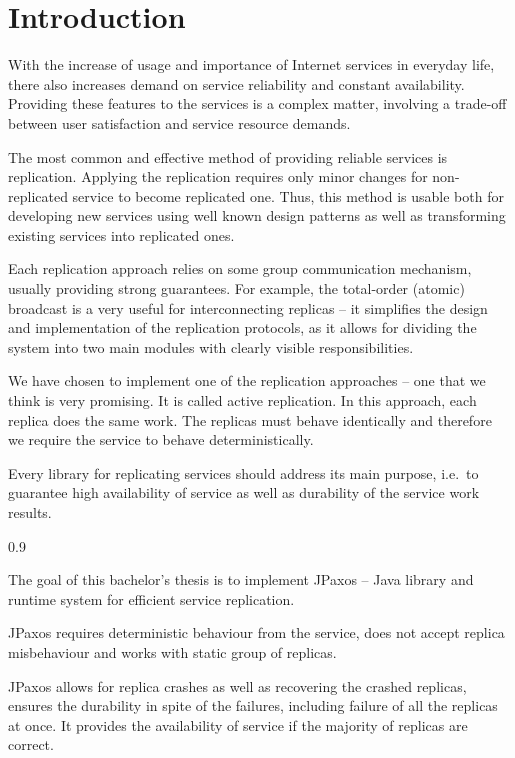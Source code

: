 \chapter{Introduction}

With the increase of usage and importance of Internet services in everyday life, there also increases demand on service reliability and constant availability.
Providing these features to the services is a complex matter, involving a trade-off between user satisfaction and service resource demands.

The most common and effective method of providing reliable services is replication. Applying the replication requires only minor changes for non-replicated service to become replicated one. Thus, this method is usable both for developing new services using well known design patterns as well as transforming existing services into replicated ones.

Each replication approach relies on some group communication mechanism, usually providing strong guarantees. For example, the total-order (atomic) broadcast is a very useful for interconnecting replicas -- it simplifies the design and implementation of the replication protocols, as it allows for dividing the system into two main modules with clearly visible responsibilities.

We have chosen to implement one of the replication approaches -- one that we think is very promising.
It is called active replication. In this approach, each replica does the same work. The replicas must behave identically and therefore we require the service to behave deterministically.

Every library for replicating services should address its main purpose, i.e.\ to guarantee high availability of service as well as durability of the service work results.


\begin{minipageWithIndent}{0.9\textwidth}
{
\bfseries

The goal of this bachelor's thesis is to implement JPaxos -- Java library and runtime system for efficient service replication.

JPaxos requires deterministic behaviour from the service, does not accept replica misbehaviour and works with static group of replicas.

JPaxos allows for replica crashes as well as recovering the crashed replicas, ensures the durability in spite of the failures, including failure of all the replicas at once. It provides the availability of service if the majority of replicas are correct.
}
\end{minipageWithIndent}

